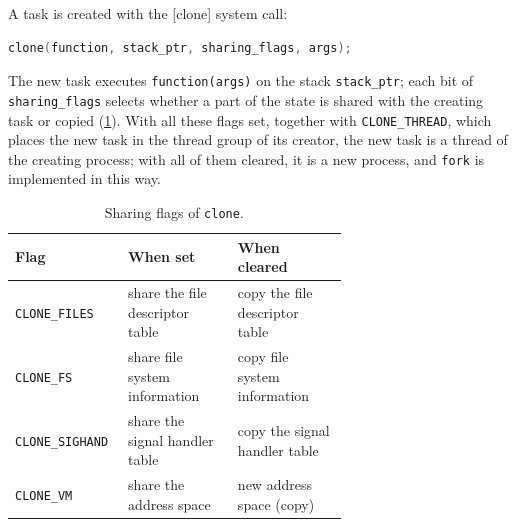 \documentclass[../main.tex]{subfiles}
\begin{document}
A task is created with the [clone] system call:
\begin{lstlisting}[language=C, numbers=none]
clone(function, stack_ptr, sharing_flags, args);
\end{lstlisting}
The new task executes \texttt{function(args)} on the stack
\texttt{stack\_ptr}; each bit of \texttt{sharing\_flags} selects whether a
part of the state is shared with the creating task or copied
(\cref{tab:l05-clone}).  With all these flags set, together with
\texttt{CLONE\_THREAD}, which places the new task in the thread group of
its creator, the new task is a thread of the creating process; with all of
them cleared, it is a new process, and \texttt{fork} is implemented in
this way.

\begin{table}[htbp]
  \centering
  \caption{Sharing flags of \texttt{clone}.}
  \label{tab:l05-clone}
  \small
  \begin{tabular}{@{}l>{\raggedright\arraybackslash}p{0.33\linewidth}>{\raggedright\arraybackslash}p{0.33\linewidth}@{}}
    \toprule
    Flag & When set & When cleared \\
    \midrule
    \texttt{CLONE\_FILES}   & share the file descriptor table
                            & copy the file descriptor table \\
    \texttt{CLONE\_FS}      & share file system information
                            & copy file system information \\
    \texttt{CLONE\_SIGHAND} & share the signal handler table
                            & copy the signal handler table \\
    \texttt{CLONE\_VM}      & share the address space
                            & new address space (copy) \\
    \bottomrule
  \end{tabular}
\end{table}
\end{document}
